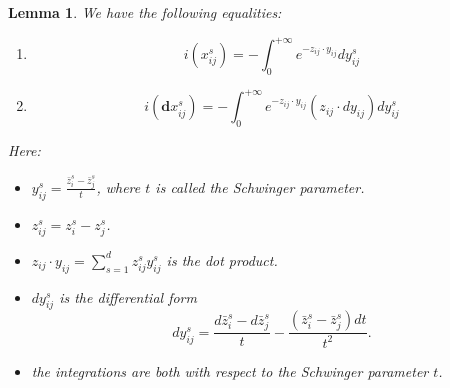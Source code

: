 \documentclass[11pt]{amsart}
\newtheorem{lem}[thm]{Lemma}
\theoremstyle{definition}
\theoremstyle{remark}
\numberwithin{equation}{section}
\begin{document}
\begin{lem}
    We have the following equalities:
    \begin{enumerate}
        \item 
        $$
        i(x_{ij}^{s})=-\int_{0}^{+\infty}e^{-z_{ij}\cdot y_{ij}}dy_{ij}^{s}
        $$
        \item 
        $$
        i(\mathbf{d}x_{ij}^{s})=-\int_{0}^{+\infty}e^{-z_{ij}\cdot y_{ij}}(z_{ij}\cdot dy_{ij})dy_{ij}^{s}
        $$
    \end{enumerate}
    Here:
        \begin{itemize}
            \item $y_{ij}^{s}=\frac{\bar{z}_{i}^{s}-\bar{z}_{j}^{s}}{t}$, where $t$ is called the Schwinger parameter.
            \item $z_{ij}^{s}=z_{i}^{s}-z_{j}^{s}$.
            \item 
            $z_{ij}\cdot y_{ij}=\sum_{s=1}^{d}z_{ij}^{s}y_{ij}^{s}$ is the dot product.
            \item $dy_{ij}^{s}$ is the differential form
            $$
            dy_{ij}^{s}=\frac{d\bar{z}_{i}^{s}-d\bar{z}_{j}^{s}}{t}-\frac{(\bar{z}_{i}^{s}-\bar{z}_{j}^{s})dt}{t^{2}}.
            $$
            \item the integrations are both with respect to the Schwinger parameter $t$.
        \end{itemize}
\end{lem}
\end{document}
